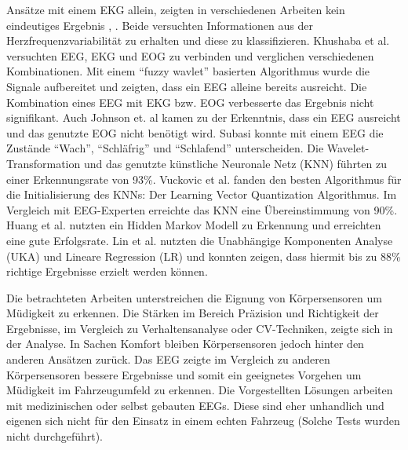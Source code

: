 Ansätze mit einem EKG allein, zeigten in verschiedenen Arbeiten kein eindeutiges Ergebnis \cite{Vicente_6164509}, \cite{Rogado_4913155}. Beide versuchten Informationen aus der Herzfrequenzvariabilität zu erhalten und diese zu klassifizieren. 
Khushaba et al. \cite{Khushaba_5580017} versuchten EEG, EKG und EOG zu verbinden und verglichen verschiedenen Kombinationen. Mit einem "`fuzzy wavlet"' basierten Algorithmus wurde die Signale aufbereitet und zeigten, dass ein EEG alleine bereits ausreicht. Die Kombination eines EEG mit EKG bzw. EOG verbesserte das Ergebnis nicht signifikant. Auch Johnson et. al \cite{Johnson11} kamen zu der Erkenntnis, dass ein EEG ausreicht und das genutzte EOG nicht benötigt wird. 
Subasi \cite{Subasi:2005:ARA:1707423.1707550} konnte mit einem EEG die Zustände "`Wach"', "`Schläfrig"' und "`Schlafend"' unterscheiden. Die Wavelet-Transformation und das genutzte künstliche Neuronale Netz (KNN) führten zu einer Erkennungsrate von 93\%. Vuckovic et al. fanden den besten Algorithmus für die Initialisierung des KNNs: Der Learning Vector Quantization Algorithmus. Im Vergleich mit EEG-Experten erreichte das KNN eine Übereinstimmung von 90\%. Huang et al. \cite{Huang_548971} nutzten ein Hidden Markov Modell zu Erkennung und erreichten eine gute Erfolgsrate. 
Lin et al. \cite{Lin05eeg-baseddrowsiness} nutzten die Unabhängige Komponenten Analyse (UKA) und Lineare Regression (LR) und konnten zeigen, dass hiermit  bis zu 88\% richtige Ergebnisse erzielt werden können. 

Die betrachteten Arbeiten unterstreichen die Eignung von Körpersensoren  um Müdigkeit zu erkennen. Die Stärken im Bereich Präzision und Richtigkeit der Ergebnisse, im Vergleich zu Verhaltensanalyse oder CV-Techniken, zeigte sich in der Analyse. In Sachen Komfort bleiben  Körpersensoren jedoch hinter den anderen Ansätzen zurück.
Das EEG zeigte im Vergleich zu anderen Körpersensoren bessere Ergebnisse und somit ein geeignetes Vorgehen um Müdigkeit im Fahrzeugumfeld zu erkennen. Die Vorgestellten Lösungen arbeiten mit medizinischen oder selbst gebauten EEGs. Diese sind eher unhandlich und eigenen sich nicht für den Einsatz in einem echten Fahrzeug (Solche Tests wurden nicht durchgeführt).